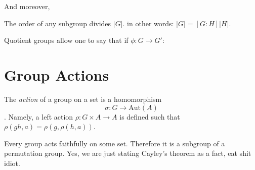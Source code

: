 \documentclass[12pt, twosided]{article}
\begin{document}
And moreover,
\begin{thm}
  The order of any subgroup divides \(|G|\). in other words:
  \(|G| = [G:H]|H|\).
\end{thm}

Quotient groups allow one to say that if \(\phi: G \to G\prime\):

\begin{center}
\end{center}

\section{Group Actions}

The \textit{action} of a group on a set is a homomorphism \[\sigma: G \to \mathrm{Aut}(A)\]. Namely, a left action \(\rho: G \times A \to A\) is defined such that \(\rho(gh, a) = \rho(g, \rho(h, a))\).

\begin{fact}
  Every group acts faithfully on some set. Therefore it is a subgroup of a permutation group. Yes, we are just stating Cayley's theorem as a fact, eat shit idiot.
\end{fact}
\end{document}
